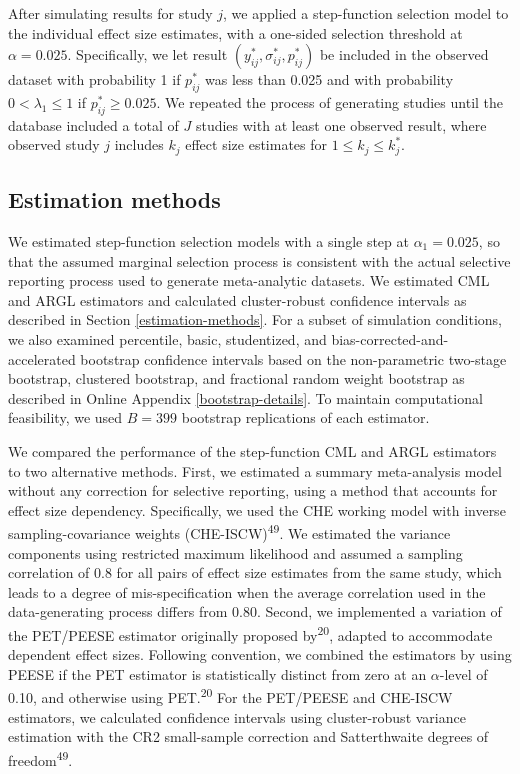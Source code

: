 \documentclass[
  man, donotrepeattitle,floatsintext]{apa7}
\begin{document}
After simulating results for study \(j\), we applied a step-function selection
model to the individual effect size estimates, with a one-sided selection
threshold at \(\alpha = 0.025\). Specifically, we let result \((y^*_{ij},
\sigma_{ij}^*, p_{ij}^*)\) be included in the observed dataset with probability
1 if \(p_{ij}^*\) was less than 0.025 and with probability \(0 < \lambda_1 \leq 1\) if \(p_{ij}^* \ge 0.025\).
We repeated the process of generating studies until the database included a total of \(J\) studies with at least one observed result, where observed study \(j\) includes \(k_j\) effect size estimates for \(1 \leq k_j \leq k_j^*\).

\subsection{Estimation methods}\label{estimation-methods-1}

We estimated step-function selection models with a single step at \(\alpha_1 = 0.025\), so that the assumed marginal selection process is consistent with the actual selective reporting process used to generate meta-analytic datasets.
We estimated CML and ARGL estimators and calculated cluster-robust confidence intervals as described in Section \ref{estimation-methods}.
For a subset of simulation conditions, we also examined percentile, basic, studentized, and bias-corrected-and-accelerated bootstrap confidence intervals based on the non-parametric two-stage bootstrap, clustered bootstrap, and fractional random weight bootstrap as described in Online Appendix \ref{bootstrap-details}.
To maintain computational feasibility, we used \(B = 399\) bootstrap replications of each estimator.

We compared the performance of the step-function CML and ARGL estimators to two alternative methods.
First, we estimated a summary meta-analysis model without any correction for selective reporting, using a method that accounts for effect size dependency.
Specifically, we used the CHE working model with inverse sampling-covariance weights (CHE-ISCW)\textsuperscript{49}.
We estimated the variance components using restricted maximum likelihood and assumed a sampling correlation of 0.8 for all pairs of effect size estimates from the same study, which leads to a degree of mis-specification when the average correlation used in the data-generating process differs from 0.80.
Second, we implemented a variation of the PET/PEESE estimator originally proposed by\textsuperscript{20}, adapted to accommodate dependent effect sizes.
Following convention, we combined the estimators by using PEESE if the PET estimator is statistically distinct from zero at an \(\alpha\)-level of 0.10, and otherwise using PET.\textsuperscript{20}
For the PET/PEESE and CHE-ISCW estimators, we calculated confidence intervals using cluster-robust variance estimation with the CR2 small-sample correction and Satterthwaite degrees of freedom\textsuperscript{49}.
\end{document}
